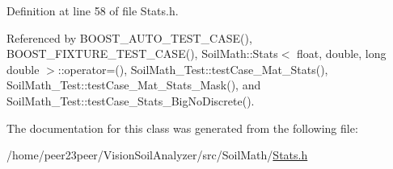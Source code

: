 Definition at line 58 of file Stats.\+h.



Referenced by B\+O\+O\+S\+T\+\_\+\+A\+U\+T\+O\+\_\+\+T\+E\+S\+T\+\_\+\+C\+A\+S\+E(), B\+O\+O\+S\+T\+\_\+\+F\+I\+X\+T\+U\+R\+E\+\_\+\+T\+E\+S\+T\+\_\+\+C\+A\+S\+E(), Soil\+Math\+::\+Stats$<$ float, double, long double $>$\+::operator=(), Soil\+Math\+\_\+\+Test\+::test\+Case\+\_\+\+Mat\+\_\+\+Stats(), Soil\+Math\+\_\+\+Test\+::test\+Case\+\_\+\+Mat\+\_\+\+Stats\+\_\+\+Mask(), and Soil\+Math\+\_\+\+Test\+::test\+Case\+\_\+\+Stats\+\_\+\+Big\+No\+Discrete().



The documentation for this class was generated from the following file\+:\begin{DoxyCompactItemize}
\item 
/home/peer23peer/\+Vision\+Soil\+Analyzer/src/\+Soil\+Math/\hyperlink{_stats_8h}{Stats.\+h}\end{DoxyCompactItemize}

